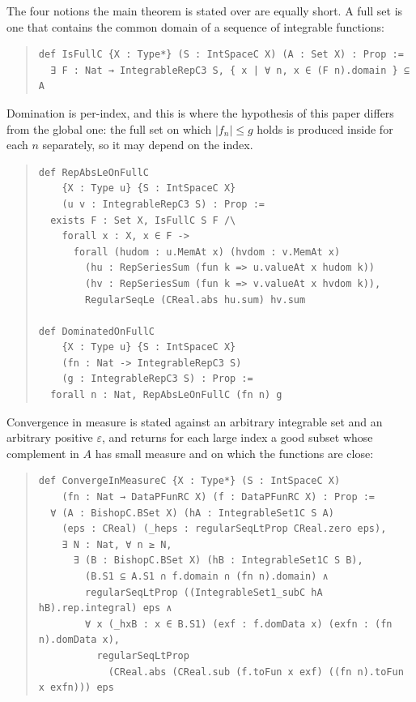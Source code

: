 \documentclass[11pt]{article}
\theoremstyle{definition}
\theoremstyle{remark}
\begin{document}
The four notions the main theorem is stated over are equally short. A full set is
one that contains the common domain of a sequence of integrable functions:

\begin{quote}\small
\begin{verbatim}
def IsFullC {X : Type*} (S : IntSpaceC X) (A : Set X) : Prop :=
  ∃ F : Nat → IntegrableRepC3 S, { x | ∀ n, x ∈ (F n).domain } ⊆ A
\end{verbatim}
\end{quote}

\noindent Domination is per-index, and this is where the hypothesis of this paper
differs from the global one: the full set on which $|f_n|\le g$ holds is produced
inside  for each $n$ separately, so it may depend on the index.

\begin{quote}\small
\begin{verbatim}
def RepAbsLeOnFullC
    {X : Type u} {S : IntSpaceC X}
    (u v : IntegrableRepC3 S) : Prop :=
  exists F : Set X, IsFullC S F /\
    forall x : X, x ∈ F ->
      forall (hudom : u.MemAt x) (hvdom : v.MemAt x)
        (hu : RepSeriesSum (fun k => u.valueAt x hudom k))
        (hv : RepSeriesSum (fun k => v.valueAt x hvdom k)),
        RegularSeqLe (CReal.abs hu.sum) hv.sum

def DominatedOnFullC
    {X : Type u} {S : IntSpaceC X}
    (fn : Nat -> IntegrableRepC3 S)
    (g : IntegrableRepC3 S) : Prop :=
  forall n : Nat, RepAbsLeOnFullC (fn n) g
\end{verbatim}
\end{quote}

\noindent Convergence in measure is stated against an arbitrary integrable set and
an arbitrary positive $\varepsilon$, and returns for each large index a good subset
whose complement in $A$ has small measure and on which the functions are close:

\begin{quote}\small
\begin{verbatim}
def ConvergeInMeasureC {X : Type*} (S : IntSpaceC X)
    (fn : Nat → DataPFunRC X) (f : DataPFunRC X) : Prop :=
  ∀ (A : BishopC.BSet X) (hA : IntegrableSet1C S A)
    (eps : CReal) (_heps : regularSeqLtProp CReal.zero eps),
    ∃ N : Nat, ∀ n ≥ N,
      ∃ (B : BishopC.BSet X) (hB : IntegrableSet1C S B),
        (B.S1 ⊆ A.S1 ∩ f.domain ∩ (fn n).domain) ∧
        regularSeqLtProp ((IntegrableSet1_subC hA hB).rep.integral) eps ∧
        ∀ x (_hxB : x ∈ B.S1) (exf : f.domData x) (exfn : (fn n).domData x),
          regularSeqLtProp
            (CReal.abs (CReal.sub (f.toFun x exf) ((fn n).toFun x exfn))) eps
\end{verbatim}
\end{quote}
\end{document}
